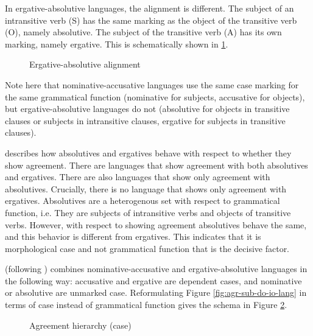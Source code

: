 In ergative-absolutive languages, the alignment is different. The subject of an intransitive verb (S) has the same marking as the object of the transitive verb (O), namely absolutive. The subject of the transitive verb (A) has its own marking, namely ergative. This is schematically shown in \ref{fig:erg-abs-lang}.

\begin{figure}[H]
  \centering
  \caption{Ergative-absolutive alignment}
  \label{fig:erg-abs-lang}
\end{figure}

Note here that nominative-accusative languages use the same case marking for the same grammatical function (nominative for subjects, accusative for objects), but ergative-absolutive languages do not (absolutive for objects in transitive clauses or subjects in intransitive clauses, ergative for subjects in transitive clauses).

\citet{bobaljik2006} describes how absolutives and ergatives behave with respect to whether they show agreement. There are languages that show agreement with both absolutives and ergatives. There are also languages that show only agreement with absolutives. Crucially, there is no language that shows only agreement with ergatives. Absolutives are a heterogenous set with respect to grammatical function, i.e. They are subjects of intransitive verbs and objects of transitive verbs. However, with respect to showing agreement absolutives behave the same, and this behavior is different from ergatives. This indicates that it is morphological case and not grammatical function that is the decisive factor.

\citeauthor{bobaljik2006} (following \citealt{marantz2000}) combines nominative-accusative and ergative-absolutive languages in the following way: accusative and ergative are dependent cases, and nominative or absolutive are unmarked case. Reformulating Figure \ref{fig:agr-sub-do-io-lang} in terms of case instead of grammatical function gives the schema in Figure \ref{fig:agr-def-dep-dat}.

\begin{figure}[H]
  \centering
  \caption{Agreement hierarchy (case)}
  \label{fig:agr-def-dep-dat}
\end{figure}

